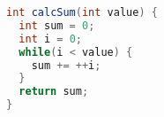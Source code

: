 \begin{lstlisting}[language=Java]
int calcSum(int value) {
  int sum = 0;
  int i = 0;
  while(i < value) {
    sum += ++i;
  }
  return sum;
}
\end{lstlisting}